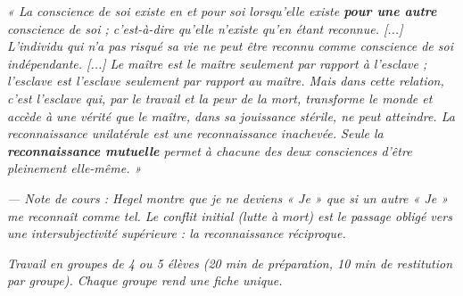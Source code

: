 \documentclass[11pt]{article}
\newcounter{popsec}
\newcounter{popsub}
\newcommand{\courssub}[1]{%
  \stepcounter{popsub}%
  \par\vspace{9pt}\noindent{\popxbold\fontsize{11.5}{13}\selectfont\color{popink}{\color{poporange}\thepopsec.\thepopsub}\hspace{6pt}#1}\par\nopagebreak\vspace{4pt}
}
\begin{document}
\begin{exemplebox}
\emph{« La conscience de soi existe en et pour soi lorsqu'elle existe \textbf{pour une autre} conscience de soi ; c'est-à-dire qu'elle n'existe qu'en étant reconnue. [...] L'individu qui n'a pas risqué sa vie ne peut être reconnu comme conscience de soi indépendante. [...] Le maître est le maître seulement par rapport à l'esclave ; l'esclave est l'esclave seulement par rapport au maître. Mais dans cette relation, c'est l'esclave qui, par le travail et la peur de la mort, transforme le monde et accède à une vérité que le maître, dans sa jouissance stérile, ne peut atteindre. La reconnaissance unilatérale est une reconnaissance inachevée. Seule la \textbf{reconnaissance mutuelle} permet à chacune des deux consciences d'être pleinement elle-même. »}

\emph{— Note de cours : Hegel montre que je ne deviens « Je » que si un autre « Je » me reconnaît comme tel. Le conflit initial (lutte à mort) est le passage obligé vers une intersubjectivité supérieure : la reconnaissance réciproque.}
\end{exemplebox}

\courssub{Consignes}
\emph{Travail en groupes de 4 ou 5 élèves (20 min de préparation, 10 min de restitution par groupe). Chaque groupe rend une fiche unique.}
\end{document}
